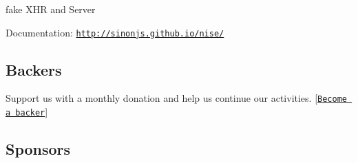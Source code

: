 fake X\+HR and Server

Documentation\+: \href{http://sinonjs.github.io/nise/}{\tt http\+://sinonjs.\+github.\+io/nise/}

\subsection*{Backers}

Support us with a monthly donation and help us continue our activities. \mbox{[}\href{https://opencollective.com/sinon#backer}{\tt Become a backer}\mbox{]}

\href{https://opencollective.com/sinon/backer/0/website}{\tt } \href{https://opencollective.com/sinon/backer/1/website}{\tt } \href{https://opencollective.com/sinon/backer/2/website}{\tt } \href{https://opencollective.com/sinon/backer/3/website}{\tt } \href{https://opencollective.com/sinon/backer/4/website}{\tt } \href{https://opencollective.com/sinon/backer/5/website}{\tt } \href{https://opencollective.com/sinon/backer/6/website}{\tt } \href{https://opencollective.com/sinon/backer/7/website}{\tt } \href{https://opencollective.com/sinon/backer/8/website}{\tt } \href{https://opencollective.com/sinon/backer/9/website}{\tt } \href{https://opencollective.com/sinon/backer/10/website}{\tt } \href{https://opencollective.com/sinon/backer/11/website}{\tt } \href{https://opencollective.com/sinon/backer/12/website}{\tt } \href{https://opencollective.com/sinon/backer/13/website}{\tt } \href{https://opencollective.com/sinon/backer/14/website}{\tt } \href{https://opencollective.com/sinon/backer/15/website}{\tt } \href{https://opencollective.com/sinon/backer/16/website}{\tt } \href{https://opencollective.com/sinon/backer/17/website}{\tt } \href{https://opencollective.com/sinon/backer/18/website}{\tt } \href{https://opencollective.com/sinon/backer/19/website}{\tt } \href{https://opencollective.com/sinon/backer/20/website}{\tt } \href{https://opencollective.com/sinon/backer/21/website}{\tt } \href{https://opencollective.com/sinon/backer/22/website}{\tt } \href{https://opencollective.com/sinon/backer/23/website}{\tt } \href{https://opencollective.com/sinon/backer/24/website}{\tt } \href{https://opencollective.com/sinon/backer/25/website}{\tt } \href{https://opencollective.com/sinon/backer/26/website}{\tt } \href{https://opencollective.com/sinon/backer/27/website}{\tt } \href{https://opencollective.com/sinon/backer/28/website}{\tt } \href{https://opencollective.com/sinon/backer/29/website}{\tt }

\subsection*{Sponsors}


